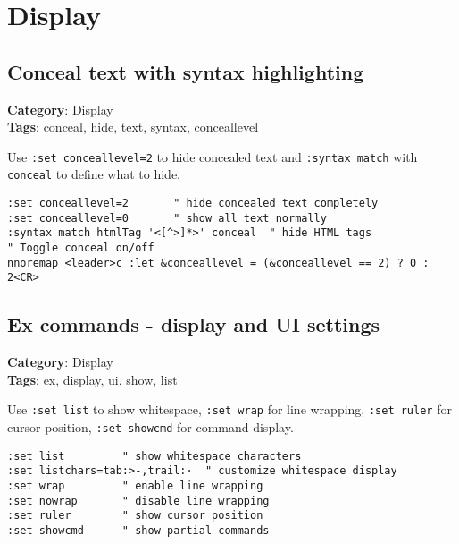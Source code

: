 {{{\chapter{Display}
\section{Conceal text with syntax highlighting}

\textbf{Category}: Display\\ \textbf{Tags}: conceal, hide, text, syntax, conceallevel
\vspace{0.5cm}

Use {\footnotesize \Verb§:set conceallevel=2§} to hide concealed text and {\footnotesize \Verb§:syntax match§} with {\footnotesize \Verb§conceal§} to define what to hide.

\begin{Exa*}{}
\begin{Verbatim}[fontsize=\footnotesize, breaklines, breakanywhere]
:set conceallevel=2       " hide concealed text completely
:set conceallevel=0       " show all text normally
:syntax match htmlTag '<[^>]*>' conceal  " hide HTML tags
" Toggle conceal on/off
nnoremap <leader>c :let &conceallevel = (&conceallevel == 2) ? 0 : 2<CR>
\end{Verbatim}
\end{Exa*}

\section{Ex commands - display and UI settings}

\textbf{Category}: Display\\ \textbf{Tags}: ex, display, ui, show, list
\vspace{0.5cm}

Use {\footnotesize \Verb§:set list§} to show whitespace, {\footnotesize \Verb§:set wrap§} for line wrapping, {\footnotesize \Verb§:set ruler§} for cursor position, {\footnotesize \Verb§:set showcmd§} for command display.

\begin{Exa*}{}
\begin{Verbatim}[fontsize=\footnotesize, breaklines, breakanywhere]
:set list         " show whitespace characters
:set listchars=tab:>-,trail:·  " customize whitespace display
:set wrap         " enable line wrapping
:set nowrap       " disable line wrapping
:set ruler        " show cursor position
:set showcmd      " show partial commands
\end{Verbatim}
\end{Exa*}

}}}
